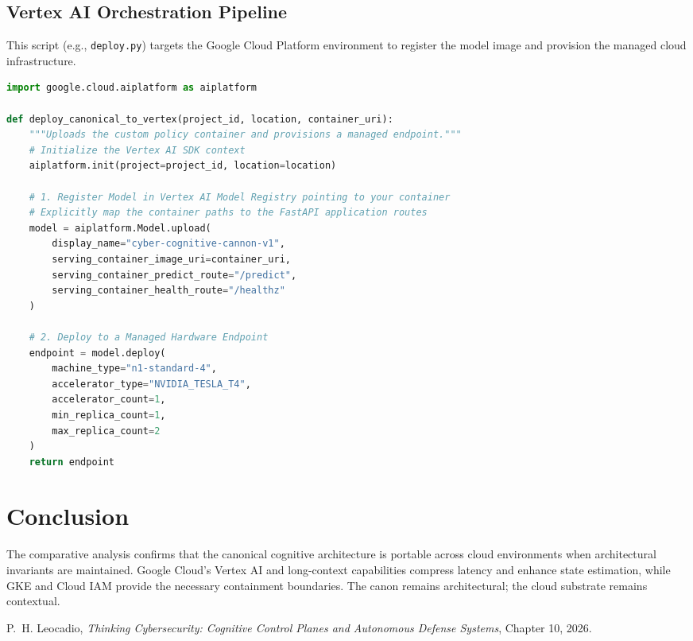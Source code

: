 \documentclass[10pt,a4paper]{article}
\begin{document}
\subsection{Vertex AI Orchestration Pipeline}
This script (e.g., \texttt{deploy.py}) targets the Google Cloud Platform environment to register the model image and provision the managed cloud infrastructure.

\begin{lstlisting}[language=Python, caption={Vertex AI Endpoint Deployment Script (deploy.py).}]
import google.cloud.aiplatform as aiplatform

def deploy_canonical_to_vertex(project_id, location, container_uri):
    """Uploads the custom policy container and provisions a managed endpoint."""
    # Initialize the Vertex AI SDK context
    aiplatform.init(project=project_id, location=location)
    
    # 1. Register Model in Vertex AI Model Registry pointing to your container
    # Explicitly map the container paths to the FastAPI application routes
    model = aiplatform.Model.upload(
        display_name="cyber-cognitive-cannon-v1",
        serving_container_image_uri=container_uri,
        serving_container_predict_route="/predict",
        serving_container_health_route="/healthz"
    )
    
    # 2. Deploy to a Managed Hardware Endpoint
    endpoint = model.deploy(
        machine_type="n1-standard-4",
        accelerator_type="NVIDIA_TESLA_T4",
        accelerator_count=1,
        min_replica_count=1,
        max_replica_count=2
    )
    return endpoint
\end{lstlisting}


\section{Conclusion}
The comparative analysis confirms that the canonical cognitive architecture is portable across cloud environments when architectural invariants are maintained. Google Cloud's Vertex AI and long-context capabilities compress latency and enhance state estimation, while GKE and Cloud IAM provide the necessary containment boundaries. The canon remains architectural; the cloud substrate remains contextual.

\begin{thebibliography}{9}
P.~H. Leocadio, \emph{Thinking Cybersecurity: Cognitive Control Planes and Autonomous Defense Systems}, Chapter 10, 2026.
\end{thebibliography}
\end{document}
